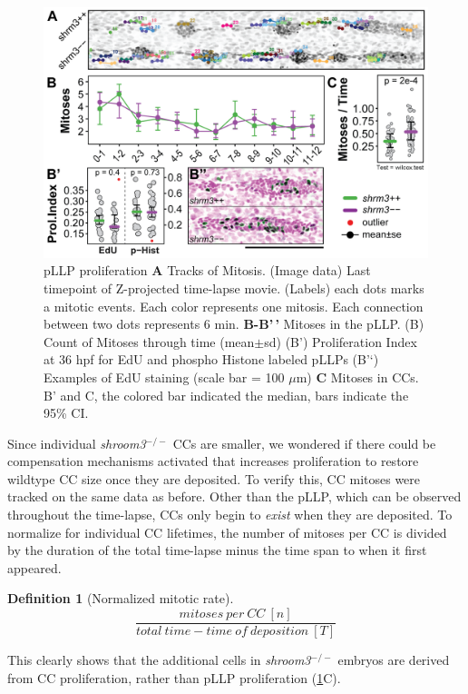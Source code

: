 \documentclass[10pt, b5paper, singlespacinge, twoside]{reedthesis} %
\theoremstyle{definition}
\newtheorem{definition}{Definition}[chapter]
\theoremstyle{definition}
\theoremstyle{definition}
\theoremstyle{remark}
\begin{document}
\begin{figure}

{\centering \includegraphics[width=0.85\linewidth]{figures/results/02_proliferation/prol-01} 

}

\caption[pLLP proliferation]{pLLP proliferation \textbf{A} Tracks of Mitosis. (Image data) Last timepoint of Z-projected time-lapse movie. (Labels) each dots marks a mitotic events. Each color represents one mitosis. Each connection between two dots represents 6 min. \textbf{B-B'\,'} Mitoses in the pLLP. (B) Count of Mitoses through time (mean\(\pm\)sd) (B') Proliferation Index at 36 hpf for EdU and phospho Histone labeled pLLPs (B'`) Examples of EdU staining (scale bar = 100 \(\mu\)m) \textbf{C} Mitoses in CCs. B' and C, the colored bar indicated the median, bars indicate the 95\% CI.}\label{fig:prolpLLP}
\end{figure}
Since individual \emph{shroom3}\(^{-/-}\) CCs are smaller, we wondered if there could be compensation mechanisms activated that increases proliferation to restore wildtype CC size once they are deposited. To verify this, CC mitoses were tracked on the same data as before. Other than the pLLP, which can be observed throughout the time-lapse, CCs only begin to \emph{exist} when they are deposited. To normalize for individual CC lifetimes, the number of mitoses per CC is divided by the duration of the total time-lapse minus the time span to when it first appeared.
\begin{definition}[Normalized mitotic rate]
\protect\hypertarget{def:unnamed-chunk-10}{}{\label{def:unnamed-chunk-10} {} }\[\frac{mitoses\ per\ CC\ [n]}{total\ time- time\ of\ deposition\ [T]}\]
\end{definition}
This clearly shows that the additional cells in \emph{shroom3}\(^{-/-}\) embryos are derived from CC proliferation, rather than pLLP proliferation (\ref{fig:prolpLLP}C).
\end{document}
